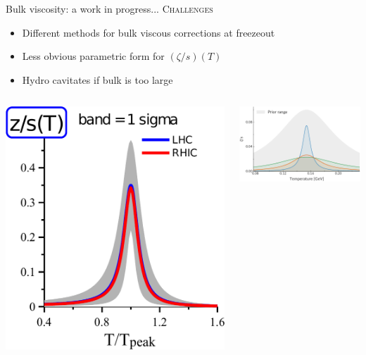 \documentclass{beamer}
\begin{document}
\begin{frame}{Bulk viscosity: a work in progress...}{}
  \medskip
  {\scshape Challenges}
  \begin{itemize}
    \small
    \item Different methods for bulk viscous corrections at freezeout
    \item Less obvious parametric form for $(\zeta/s)(T)$
    \item Hydro cavitates if bulk is too large 
  \end{itemize}
  \vspace{.5cm}

  \begin{columns}[b]
    \begin{column}{.38\textwidth}
      \includegraphics[width=\columnwidth]{gabriel_bulk}
    \end{column}
    \begin{column}{.62\textwidth}
      \includegraphics[width=\columnwidth]{jbernhard_qm2017}\\
    \end{column}
  \end{columns}


\end{frame}
\end{document}
